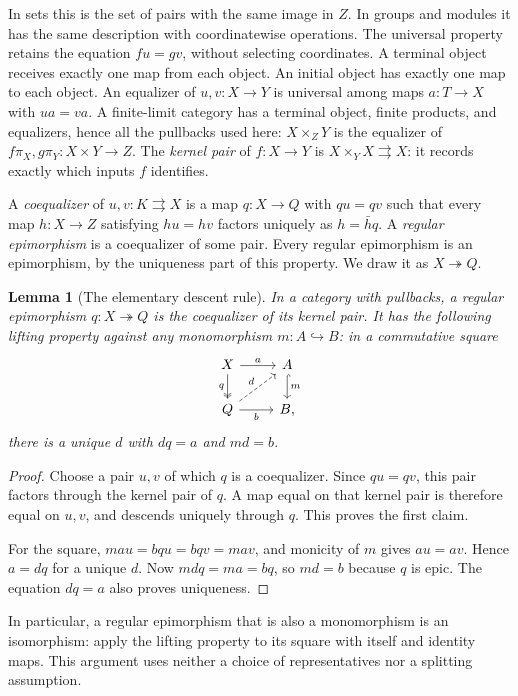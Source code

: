 \documentclass[11pt]{article}
\newtheorem{lemma}[theorem]{Lemma}
\theoremstyle{definition}
\theoremstyle{remark}\newtheorem{remark}[theorem]{Remark}
\begin{document}
In sets this is the set of pairs with the same image in $Z$. In groups
and modules it has the same description with coordinatewise operations.
The universal property retains the equation $fu=gv$, without selecting
coordinates. A terminal object receives exactly one map from each object.
An initial object has exactly one map to each object.
An equalizer of $u,v:X\to Y$ is universal among maps $a:T\to X$ with
$ua=va$. A finite-limit category has a terminal object, finite products,
and equalizers, hence all the pullbacks used here: $X\times_ZY$ is the
equalizer of $f\pi_X,g\pi_Y:X\times Y\to Z$. The
\emph{kernel pair} of $f:X\to Y$ is
$X\times_YX\rightrightarrows X$: it records exactly which inputs $f$
identifies.

A \emph{coequalizer} of $u,v:K\rightrightarrows X$ is a map $q:X\to Q$
with $qu=qv$ such that every map $h:X\to Z$ satisfying $hu=hv$ factors
uniquely as $h=\bar hq$. A \emph{regular epimorphism} is a coequalizer
of some pair. Every regular epimorphism is an epimorphism, by the
uniqueness part of this property. We draw it as $X\twoheadrightarrow Q$.

\begin{lemma}[The elementary descent rule]\label{f:descent}
In a category with pullbacks, a regular epimorphism $q:X\twoheadrightarrow Q$
is the coequalizer of its kernel pair. It has the following lifting
property against any monomorphism $m:A\hookrightarrow B$: in a
commutative square
\[
\begin{tikzcd}
X \arrow[r,"a"] \arrow[d,two heads,"q"'] & A \arrow[d,hook,"m"]\\
Q \arrow[r,"b"'] \arrow[ur,dashed,"d"] & B,
\end{tikzcd}
\]
there is a unique $d$ with $dq=a$ and $md=b$.
\end{lemma}
\begin{proof}
Choose a pair $u,v$ of which $q$ is a coequalizer. Since $qu=qv$, this
pair factors through the kernel pair of $q$. A map equal on that kernel
pair is therefore equal on $u,v$, and descends uniquely through $q$.
This proves the first claim.

For the square, $ma u=bq u=bq v=ma v$, and monicity of $m$ gives
$a u=a v$. Hence $a=dq$ for a unique $d$. Now $mdq=ma=bq$, so
$md=b$ because $q$ is epic. The equation $dq=a$ also proves uniqueness.
\end{proof}

In particular, a regular epimorphism that is also a monomorphism is an
isomorphism: apply the lifting property to its square with itself and
identity maps. This argument uses neither a choice of representatives nor
a splitting assumption.
\end{document}
